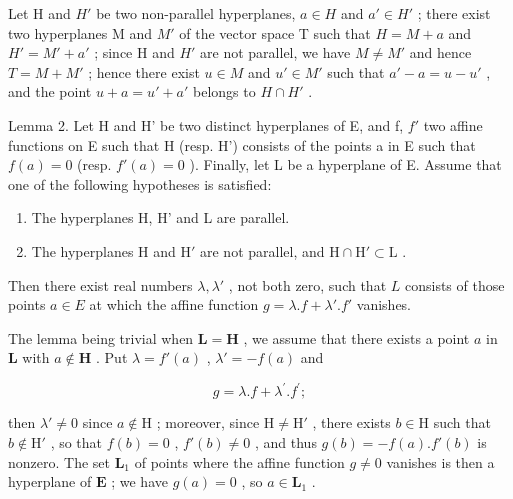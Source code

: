 Let H and \(H'\) be two non-parallel hyperplanes, \(a \in H\) and \(a' \in H'\) ; there exist two hyperplanes M and \(M'\) of the vector space T such that \(H = M + a\) and \(H' = M' + a'\) ; since H and \(H'\) are not parallel, we have \(M \neq M'\) and hence \(T = M + M'\) ; hence there exist \(u \in M\) and \(u' \in M'\) such that \(a' - a = u - u'\) , and the point \(u + a = u' + a'\) belongs to \(H \cap H'\) .

Lemma 2. Let H and H' be two distinct hyperplanes of E, and f, \(f'\) two affine functions on E such that H (resp. H') consists of the points a in E such that \(f(a) = 0\) (resp. \(f'(a) = 0\) ). Finally, let L be a hyperplane of E. Assume that one of the following hypotheses is satisfied:

\begin{enumerate}
\def\labelenumi{\alph{enumi})}
\item
  The hyperplanes H, H' and L are parallel.
\item
  The hyperplanes H and \(\mathrm{H}'\) are not parallel, and \(\mathrm{H} \cap \mathrm{H}' \subset \mathrm{L}\) .
\end{enumerate}

Then there exist real numbers \(\lambda, \lambda'\) , not both zero, such that \(L\) consists of those points \(a \in E\) at which the affine function \(g = \lambda.f + \lambda'.f'\) vanishes.

The lemma being trivial when \(\mathbf{L} = \mathbf{H}\) , we assume that there exists a point \(a\) in \(\mathbf{L}\) with \(a \notin \mathbf{H}\) . Put \(\lambda = f'(a)\) , \(\lambda' = -f(a)\) and

\[
g = \lambda . f + \lambda^ {\prime}. f ^ {\prime};
\]

then \(\lambda' \neq 0\) since \(a \notin \mathrm{H}\) ; moreover, since \(\mathrm{H} \neq \mathrm{H}'\) , there exists \(b \in \mathrm{H}\) such that \(b \notin \mathrm{H}'\) , so that \(f(b) = 0\) , \(f'(b) \neq 0\) , and thus \(g(b) = -f(a).f'(b)\) is nonzero. The set \(\mathbf{L}_1\) of points where the affine function \(g \neq 0\) vanishes is then a hyperplane of \(\mathbf{E}\) ; we have \(g(a) = 0\) , so \(a \in \mathbf{L}_1\) .

